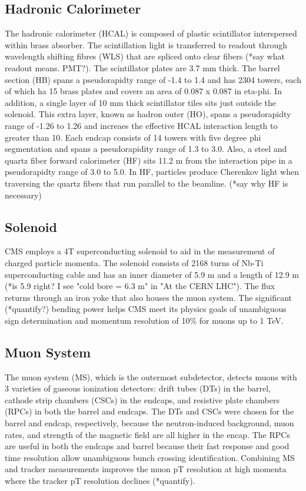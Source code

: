 \documentclass[12pt]{article}
\begin{document}
\subsection{Hadronic Calorimeter}
    The hadronic calorimeter (HCAL) is composed of plastic scintillator interspersed within brass absorber. The scintillation light is transferred to readout through wavelength shifting fibres (WLS) that are spliced onto clear fibers (*say what readout means. PMT?). The scintillator plates are 3.7 mm thick.
    The barrel section (HB) spans a pseudorapidty range of -1.4 to 1.4 and has 2304 towers, each of which ha 15 brass plates and covers an area of 0.087 x 0.087 in eta-phi. In addition, a single layer of 10 mm thick scintillator tiles sits just outside the solenoid. This extra layer, known as hadron outer (HO), spans a pseudorapidty range of -1.26 to 1.26 and increaes the effective HCAL interaction length to greater than 10.
    Each endcap consists of 14 towers with five degree phi segmentation and spans a pseudorapidity range of 1.3 to 3.0. Also, a steel and quartz fiber forward calorimeter (HF) sits 11.2 m from the interaction pipe in a pseudorapidty range of 3.0 to 5.0. In HF, particles produce Cherenkov light when traversing the quartz fibers that run parallel to the beamline. (*say why HF is necessary)

\subsection{Solenoid}
    CMS employs a 4T superconducting solenoid to aid in the measurement of charged particle momenta. The solenoid consists of 2168 turns of Nb-Ti superconducting cable and has an inner diameter of 5.9 m and a length of 12.9 m (*is 5.9 right? I see "cold bore = 6.3 m" in "At the CERN LHC"). The flux returns through an iron yoke that also houses the muon system. The significant (*quantify?) bending power helps CMS meet its physics goals of unambiguous sign determination and momentum resolution of 10\% for muons up to 1 TeV.

\subsection{Muon System}
    The muon system (MS), which is the outermost subdetector, detects muons with 3 varieties of gaseous ionization detectors: drift tubes (DTs) in the barrel, cathode strip chambers (CSCs) in the endcaps, and resistive plate chambers (RPCs) in both the barrel and endcaps. The DTs and CSCs were chosen for the barrel and endcap, respectively, because the neutron-induced background, muon rates, and strength of the magnetic field are all higher in the encap. The RPCs are useful in both the endcaps and barrel because their fast response and good time resolution allow unambiguous bunch crossing identification. Combining MS and tracker measurements improves the muon pT resolution at high momenta where the tracker pT resolution declines (*quantify).
\end{document}
